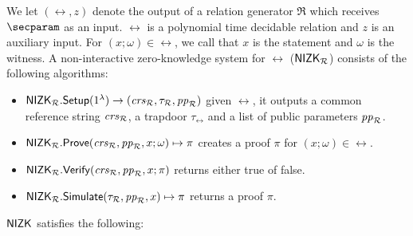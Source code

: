 
% 

We let $ (\rel, z) $ denote the output of a relation generator $ \mathfrak{R} $ which receives $ \secparam $ as an input. $ \rel $ is a polynomial time decidable relation and $ z $ is an auxiliary input. For $ (x; \omega) \in \rel $, we call that $x$ is the statement and $ \omega $ is the witness.
A non-interactive zero-knowledge system for $\rel$ ($ {\mathsf{NIZK}}_{\mathcal{R}} $)  consists of the following algorithms:
\begin{itemize}
	\item ${\mathsf{NIZK}}_{\mathcal{R}}.{\mathsf{Setup}}(1^{\lambda}) \rightarrow (\mathit{crs}_{\mathcal{R}}, \tau_{\mathcal{R}}, \mathit{pp}_{\mathcal{R}})$  given $ \rel $, it outputs a common reference string $ \mathit{crs}_{\mathcal{R}} $, a trapdoor $ \tau_\rel $ and a list of public parameters $\mathit{pp}_{\mathcal{R}}$. 
	\item ${\mathsf{NIZK}}_{\mathcal{R}}.{\mathsf{Prove}}(\mathit{crs}_{\mathcal{R}}, \mathit{pp}_{\mathcal{R}}, x; \omega) \mapsto \pi$ creates a proof $\pi$ for  $(x; \omega) \in \rel$. 
	\item ${\mathsf{NIZK}}_{\mathcal{R}}.{\mathsf{Verify}}(\mathit{crs}_{\mathcal{R}}, \mathit{pp}_{\mathcal{R}}, x; \pi)$ returns either true of false.
	\item $ {\mathsf{NIZK}}_{\mathcal{R}}.{\mathsf{Simulate}}(\tau_{\mathcal{R}}, \mathit{pp}_{\mathcal{R}}, x) \mapsto \pi$ returns a proof $ \pi $.
\end{itemize}	
$ {\mathsf{NIZK}} $ satisfies the following:


